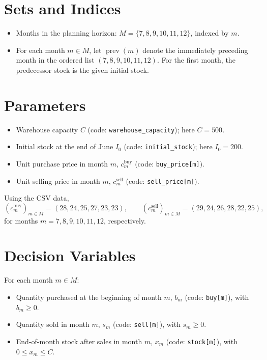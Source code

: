 \section*{Sets and Indices}

\begin{itemize}
    \item Months in the planning horizon: $M = \{7,8,9,10,11,12\}$, indexed by $m$.
    \item For each month $m \in M$, let $\operatorname{prev}(m)$ denote the immediately preceding month in the ordered list $(7,8,9,10,11,12)$. For the first month, the predecessor stock is the given initial stock.
\end{itemize}

\section*{Parameters}

\begin{itemize}
    \item Warehouse capacity $C$ (code: \texttt{warehouse\_capacity}); here $C=500$.
    \item Initial stock at the end of June $I_0$ (code: \texttt{initial\_stock}); here $I_0=200$.
    \item Unit purchase price in month $m$, $c_m^{\text{buy}}$ (code: \texttt{buy\_price[m]}$)$.
    \item Unit selling price in month $m$, $c_m^{\text{sell}}$ (code: \texttt{sell\_price[m]}$)$.
\end{itemize}

Using the CSV data,
\[
(c_m^{\text{buy}})_{m\in M} = (28,24,25,27,23,23),
\qquad
(c_m^{\text{sell}})_{m\in M} = (29,24,26,28,22,25),
\]
for months $m=7,8,9,10,11,12$, respectively.

\section*{Decision Variables}

For each month $m \in M$:
\begin{itemize}
    \item Quantity purchased at the beginning of month $m$, $b_m$ (code: \texttt{buy[m]}), with $b_m \ge 0$.
    \item Quantity sold in month $m$, $s_m$ (code: \texttt{sell[m]}), with $s_m \ge 0$.
    \item End-of-month stock after sales in month $m$, $x_m$ (code: \texttt{stock[m]}), with $0 \le x_m \le C$.
\end{itemize}

